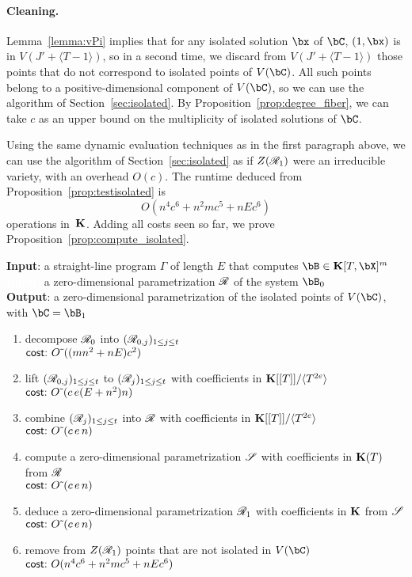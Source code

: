 \documentclass[12pt]{article}
\begin{document}
\paragraph{Cleaning.}
Lemma~\ref{lemma:vPi} implies that for any isolated solution $\bx$ of
$\bC$, $(1,\bx)$ is in $V(J' + \langle T-1\rangle)$, so in a second
time, we discard from $V(J' + \langle T-1\rangle)$ those points that
do not correspond to isolated points of $V(\bC)$. All such points
belong to a positive-dimensional component of $V(\bC)$, so we can use
the algorithm of Section~\ref{sec:isolated}. By
Proposition~\ref{prop:degree_fiber}, we can take $c$ as an upper bound
on the multiplicity of isolated solutions of $\bC$.

Using the same dynamic evaluation techniques as in the first paragraph
above, we can use the algorithm of Section~\ref{sec:isolated} as if
$Z(\mathscr{R}_1)$ were an irreducible variety, with an overhead 
$O(c)$. The runtime deduced from Proposition~\ref{prop:testisolated} is
$$O(n^4 c^6 + n^2 m c^5 + n E c^6)$$ operations in~$\mathbf{K}$. Adding all
costs seen so far, we prove Proposition~\ref{prop:compute_isolated}.
\begin{algorithm}
\caption{$\mathsf{Homotopy}(\Gamma,\scrR)$}
{\bf Input}: a straight-line program $\Gamma$ of length $E$ that computes $\bB \in \KK[T,\bX]^m$\\
\textcolor{white}{{\bf Input}:} a zero-dimensional parametrization $\mathscr{R}$ of the system $\bB_0$\\
{\bf Output}: a zero-dimensional parametrization of the isolated points of $V(\bC)$, with $\bC=\bB_1$
\begin{enumerate}
  \setlength\itemsep{0em}
\item decompose $\mathscr{R}_0$ into $(\mathscr{R}_{0,j})_{1 \leq j \leq t}$\\
$\text{\sf{cost:~}} {O}{\,\tilde{ }\,}((mn^2 + nE) c^2)$
\item lift $(\mathscr{R}_{0,j})_{1 \leq j \leq t}$ to $(\mathscr{R}_j)_{1\leq j \leq t}$ with 
  coefficients in $\mathbf{K}[[T]]/\langle T^{2e}\rangle$\\
$\text{\sf{cost:~}} {O}{\,\tilde{ }\,}(c\,e (E+n^2)n)$
\item combine $(\mathscr{R}_j)_{1 \leq j \leq t}$ into  $\mathscr{R}$ with coefficients in $\mathbf{K}[[T]]/\langle T^{2e}\rangle$\\
$\text{\sf{cost:~}} {O}{\,\tilde{ }\,}(c\,e\,n)$
\item compute a zero-dimensional parametrization $\mathscr{S}$ with coefficients in $\mathbf{K}(T)$ from $\mathscr{R}$\\
$\text{\sf{cost:~}} {O}{\,\tilde{ }\,}(c\,e\,n)$
\item deduce a zero-dimensional parametrization $\mathscr{R}_1$ with coefficients in $\mathbf{K}$ from $\mathscr{S}$\\
$\text{\sf{cost:~}} {O}{\,\tilde{ }\,}(c\,e\,n)$
\item remove from $Z(\mathscr{R}_1)$ points that are not isolated in $V(\bC)$ \\
$\text{\sf{cost:~}} O(n^4 c^6 + n^2 m c^5 + n E c^6)$
\end{enumerate}
\label{DetSys}
\end{algorithm}
 
\end{document}
